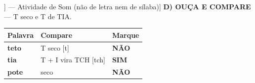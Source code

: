 \begin{exercicio}[Som /tch/ [[tS]] --- Atividade de Som (não de letra nem de sílaba)]
\textbf{D) OUÇA E COMPARE} --- T seco e T de TIA.

\begin{center}
\begin{tabular}{@{}p{4.2cm}p{6.2cm}p{1.6cm}@{}}
\hline
\textbf{Palavra} & \textbf{Compare} & \textbf{Marque} \\
\hline
\textbf{teto} & T seco [t] & \textbf{NÃO} \\
\textbf{tia} & T + I vira TCH [tch] & \textbf{SIM} \\
\textbf{pote} & seco & \textbf{NÃO} \\
\hline
\end{tabular}
\end{center}

\end{exercicio}

